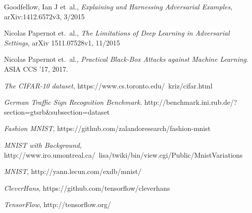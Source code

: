 \documentclass{article}
\begin{document}
\begin{thebibliography}{9}
\raggedright
{}
    Goodfellow, Ian J et\ al.,
    \emph{Explaining and Harnessing Adversarial Examples},	
    arXiv:1412.6572v3,
    3/2015

    Nicolas Papernot et.\ al.,
    \emph{The Limitations of Deep Learning in Adversarial Settings},
    arXiv 1511.07528v1,
    11/2015

    Nicolas Papernot et.\ al.,
    \emph{Practical Black-Box Attacks against Machine Learning}.
    ASIA CCS '17,
    2017.

    \emph{The CIFAR-10 dataset},
    https://www.cs.toronto.edu/~kriz/cifar.html

    \emph{German Traffic Sign Recognition Benchmark}.
    http://benchmark.ini.rub.de/?section=gtsrb\&subsection=dataset

    \emph{Fashion MNIST},
    https://github.com/zalandoresearch/fashion-mnist

    \emph{MNIST with Background},
    http://www.iro.umontreal.ca/~lisa/twiki/bin/view.cgi/Public/MnistVariations

    \emph{MNIST},
    http://yann.lecun.com/exdb/mnist/

    \emph{CleverHans},
    https://github.com/tensorflow/cleverhans

    \emph{TensorFlow},
    http://tensorflow.org/

\end{thebibliography}
\end{document}
